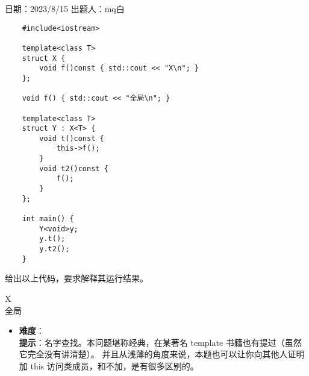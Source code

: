 日期：2023/8/15 出题人：mq白

\begin{verbatim}
    #include<iostream>

    template<class T>
    struct X {
        void f()const { std::cout << "X\n"; }
    };
    
    void f() { std::cout << "全局\n"; }
    
    template<class T>
    struct Y : X<T> {
        void t()const {
            this->f();
        }
        void t2()const {
            f();
        }
    };
    
    int main() {
        Y<void>y;
        y.t();
        y.t2();
    }
\end{verbatim}

给出以上代码，要求解释其运行结果。

\begin{tcolorbox}[title = {要求运行结果},
        fonttitle = \bfseries, fontupper = \sffamily, fontlower = \itshape]
    X\\
    全局
\end{tcolorbox}

\begin{itemize}
    \item \textbf{难度}：  \\
          \textbf{提示}：名字查找。本问题堪称经典，在某著名 template 书籍也有提过（虽然它完全没有讲清楚）。 并且从浅薄的角度来说，本题也可以让你向其他人证明加 this 访问类成员，和不加，是有很多区别的。
\end{itemize}